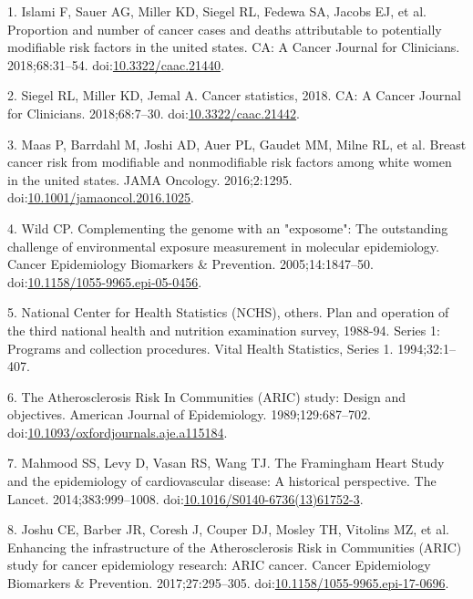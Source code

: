 \documentclass[12pt,oneside]{reedthesis}
\theoremstyle{definition}
\theoremstyle{definition}
\theoremstyle{definition}
\theoremstyle{remark}
\begin{document}
\hypertarget{refs}{}
\leavevmode\hypertarget{ref-Islami_2018}{}%
1. Islami F, Sauer AG, Miller KD, Siegel RL, Fedewa SA, Jacobs EJ, et
al. Proportion and number of cancer cases and deaths attributable to
potentially modifiable risk factors in the united states. CA: A Cancer
Journal for Clinicians. 2018;68:31--54.
doi:\href{https://doi.org/10.3322/caac.21440}{10.3322/caac.21440}.

\leavevmode\hypertarget{ref-Siegel_2018}{}%
2. Siegel RL, Miller KD, Jemal A. Cancer statistics, 2018. CA: A Cancer
Journal for Clinicians. 2018;68:7--30.
doi:\href{https://doi.org/10.3322/caac.21442}{10.3322/caac.21442}.

\leavevmode\hypertarget{ref-Maas_2016}{}%
3. Maas P, Barrdahl M, Joshi AD, Auer PL, Gaudet MM, Milne RL, et al.
Breast cancer risk from modifiable and nonmodifiable risk factors among
white women in the united states. JAMA Oncology. 2016;2:1295.
doi:\href{https://doi.org/10.1001/jamaoncol.2016.1025}{10.1001/jamaoncol.2016.1025}.

\leavevmode\hypertarget{ref-Wild_2005}{}%
4. Wild CP. Complementing the genome with an "exposome": The outstanding
challenge of environmental exposure measurement in molecular
epidemiology. Cancer Epidemiology Biomarkers \& Prevention.
2005;14:1847--50.
doi:\href{https://doi.org/10.1158/1055-9965.epi-05-0456}{10.1158/1055-9965.epi-05-0456}.

\leavevmode\hypertarget{ref-nhanes_1994}{}%
5. National Center for Health Statistics (NCHS), others. Plan and
operation of the third national health and nutrition examination survey,
1988-94. Series 1: Programs and collection procedures. Vital Health
Statistics, Series 1. 1994;32:1--407.

\leavevmode\hypertarget{ref-ARIC_1989}{}%
6. The Atherosclerosis Risk In Communities (ARIC) study: Design and
objectives. American Journal of Epidemiology. 1989;129:687--702.
doi:\href{https://doi.org/10.1093/oxfordjournals.aje.a115184}{10.1093/oxfordjournals.aje.a115184}.

\leavevmode\hypertarget{ref-Mahmood_2014}{}%
7. Mahmood SS, Levy D, Vasan RS, Wang TJ. The Framingham Heart Study and
the epidemiology of cardiovascular disease: A historical perspective.
The Lancet. 2014;383:999--1008.
doi:\href{https://doi.org/10.1016/S0140-6736(13)61752-3}{10.1016/S0140-6736(13)61752-3}.

\leavevmode\hypertarget{ref-Joshu_2017}{}%
8. Joshu CE, Barber JR, Coresh J, Couper DJ, Mosley TH, Vitolins MZ, et
al. Enhancing the infrastructure of the Atherosclerosis Risk in
Communities (ARIC) study for cancer epidemiology research: ARIC cancer.
Cancer Epidemiology Biomarkers \& Prevention. 2017;27:295--305.
doi:\href{https://doi.org/10.1158/1055-9965.epi-17-0696}{10.1158/1055-9965.epi-17-0696}.
\end{document}
